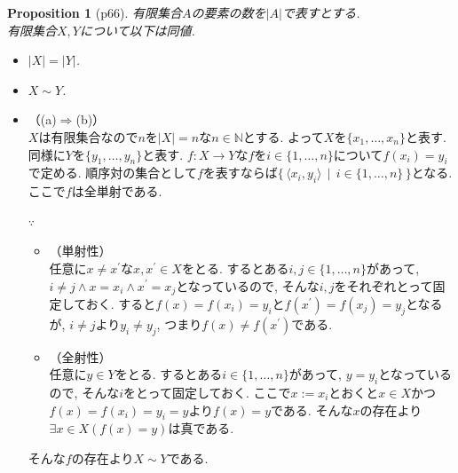 \documentclass[a4j,dvipdfmx,10pt]{ujreport}
\makeatletter
\theoremstyle{mystyle}
\newtheorem{my-proposition}[my-theorem]{Proposition}
\newcommand{\thmsymbol}{$\blacksquare$}
\newenvironment{proposition}[1][]{
  \begin{my-proposition}[#1]%
  \renewcommand{\qedsymbol}{\thmsymbol}\pushQED{\qed}}%
  {\popQED\end{my-proposition}
}
\renewcommand{\proofname}{Proof}
\renewenvironment{proof}[1][\proofname]{\par
  \pushQED{\qed}%
  \normalfont \topsep6\p@\@plus6\p@\relax
  \trivlist
  \item[\hskip\labelsep
        \itshape
    {\bf\underline{#1}\@addpunct{\ }}]\ignorespaces
}{%
  \popQED\endtrivlist\@endpefalse
}
\newcommand{\subblockcolback}{%
  \ifodd\subblocklevel BIP-back\else white\fi
}
\newenvironment{sub-block}[1]
  {%
    \global\advance\subblocklevel by 1\relax
    \expandafter\gdef\csname sb@footnotes@\the\subblocklevel\endcsname{}%
    \vspace{-5pt}
    \begin{tcolorbox}[
      colback = \subblockcolback,
      colframe = white,
      boxrule = 5pt,
      fonttitle = \bfseries,
      breakable = true]
    \begin{itemize} \item[#1]
  }
  {%
    \end{itemize}
    \end{tcolorbox}
    \vspace{-5pt}
    \csname sb@footnotes@\the\subblocklevel\endcsname
    \global\advance\subblocklevel by -1\relax
  }
\newcommand{\tempdefeq}{:=}
\newcommand{\ImpDir}[2]{
  \hspace{-0.5cm}（\;(#1)$\Rightarrow$(#2)\;）
}
\newcommand{\dash}[1]{#1 ^{\prime}}
\newcommand{\SetBar}[2]{
  \{\,#1\,\mid\,#2\,\}
}
\newcommand{\op}[2]{\langle #1,#2 \rangle}
\newcommand{\map}[3]{#1\colon #2 \to #3}
\makeatother
\begin{document}
\begin{proposition}[p66]
  有限集合$A$の要素の数を$|A|$で表すとする. \\
  有限集合$X,Y$について以下は同値.
  \begin{itemize}
    \item[(a)] $|X|=|Y|$.
    \item[(b)] $X\sim Y$. \qedhere
  \end{itemize}
\end{proposition}

\begin{proof}
  \mbox{}
  \begin{itemize}
    \item[] \ImpDir{a}{b} \\
      $X$は有限集合なので$n$を$|X|=n$な$n\in \mathbb{N}$とする.
      よって$X$を$\{ x_1,\dots,x_n \}$と表す.
      同様に$Y$を$\{ y_1,\dots,y_n \}$と表す.
      $\map{f}{X}{Y}$な$f$を$i\in \{ 1,\dots,n\}$について$f(x_i)=y_i$で定める.
      順序対の集合として$f$を表すならば$\SetBar{ \op{x_i}{y_i} }{ i\in \{ 1,\dots,n\} }$となる.
      ここで$f$は全単射である.
      \begin{sub-block}{{\boldmath $\because$}\,}
        \begin{itemize}
          \item[] \hspace{-0.5cm}（単射性） \\
            任意に$x\neq \dash{x}$な$x,\dash{x}\in X$をとる.
            するとある$i,j\in \{ 1,\dots,n\}$があって,
            $i\neq j\land x=x_i\land \dash{x}=x_j$となっているので,
            そんな$i,j$をそれぞれとって固定しておく.
            すると$f(x)=f(x_i)=y_i$と$f(\dash{x})=f(x_j)=y_j$となるが,
            $i\neq j$より$y_i\neq y_j$,
            つまり$f(x)\neq f(\dash{x})$である.

          \item[] \hspace{-0.5cm}（全射性） \\ 
            任意に$y\in Y$をとる.
            するとある$i\in \{ 1,\dots,n\}$があって,
            $y=y_i$となっているので,
            そんな$i$をとって固定しておく.
            ここで$x\tempdefeq x_i$とおくと$x\in X$かつ$f(x)=f(x_i)=y_i=y$より$f(x)=y$である.
            そんな$x$の存在より$\exists x\in X( f(x)=y )$は真である.
        \end{itemize}
      \end{sub-block}
      そんな$f$の存在より$X\sim Y$である.
      

\end{itemize}
\end{proof}
\end{document}

